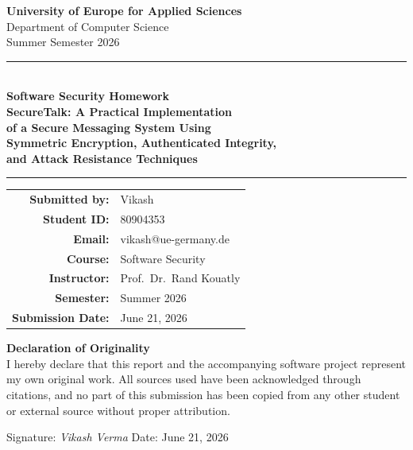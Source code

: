 \documentclass[conference]{IEEEtran}
\begin{document}
\onecolumn
\thispagestyle{empty}
\begin{center}
\vspace*{1.5cm}

{\Large \textbf{University of Europe for Applied Sciences}}\\[0.3cm]
{\large Department of Computer Science}\\[0.2cm]
{\large Summer Semester 2026}

\vspace{2.5cm}

\rule{\linewidth}{0.5mm} \\[0.5cm]

{\LARGE \textbf{Software Security Homework}}\\[0.8cm]
{\Large \textbf{SecureTalk: A Practical Implementation\\[0.2cm]
of a Secure Messaging System Using\\[0.2cm]
Symmetric Encryption, Authenticated Integrity,\\[0.2cm]
and Attack Resistance Techniques}}\\[0.5cm]

\rule{\linewidth}{0.5mm}

\vspace{2.5cm}

\begin{tabular}{rl}
\textbf{Submitted by:} & Vikash \\[0.3cm]
\textbf{Student ID:} & 80904353 \\[0.3cm]
\textbf{Email:} & vikash@ue-germany.de \\[0.3cm]
\textbf{Course:} & Software Security \\[0.3cm]
\textbf{Instructor:} & Prof.\ Dr.\ Rand Kouatly \\[0.3cm]
\textbf{Semester:} & Summer 2026 \\[0.3cm]
\textbf{Submission Date:} & June 21, 2026 \\
\end{tabular}

\vfill

\begin{minipage}{0.9\linewidth}
\centering
\textbf{Declaration of Originality}\\[0.3cm]
\small
I hereby declare that this report and the accompanying software project
represent my own original work. All sources used have been acknowledged
through citations, and no part of this submission has been copied from
any other student or external source without proper attribution.

Signature: \textit{Vikash Verma} \qquad Date: June 21, 2026
\end{minipage}

\vspace{1.5cm}
\end{center}
\end{document}
